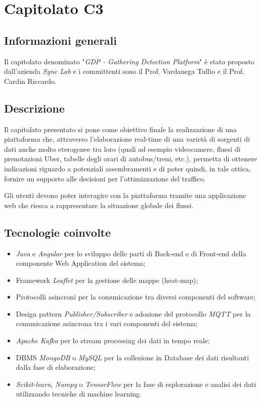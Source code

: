 \section{Capitolato C3}

\subsection{Informazioni generali}{

Il capitolato denominato "\textit{GDP - Gathering Detection Platform}" è stato proposto dall'azienda \textit{Sync Lab} e i committenti sono il Prof. Vardanega Tullio e il Prof. Cardin Riccardo.
}

\subsection{Descrizione}{
Il capitolato presentato si pone come obiettivo finale la realizzazione di una piattaforma che, attraverso l'elaborazione real-time di una varietà di sorgenti di dati anche molto eterogenee tra loro (quali ad esempio videocamere, flussi di prenotazioni Uber, tabelle degli orari di autobus/treni, etc.), permetta di ottenere indicazioni riguardo a potenziali assembramenti e di poter quindi, in tale ottica, fornire un supporto alle decisioni per l'ottimizzazione del traffico.

Gli utenti devono poter interagire con la piattaforma tramite una applicazione web che riesca a rappresentare la situazione globale dei flussi.
}

\subsection{Tecnologie coinvolte}{
\begin{itemize}
\item \textit{Java} e \textit{Angular} per lo sviluppo delle parti di Back-end e di Front-end della componente Web Application del sistema; 
\item Framework \textit{Leaflet} per la gestione delle mappe (heat-map);
\item Protocolli asincroni per la comunicazione tra diversi componenti del software;
\item Design pattern \textit{Publisher/Subscriber} e adozione del protocollo \textit{MQTT} per la comunicazione asincrona tra i vari componenti del sistema;
\item \textit{Apache Kafka} per lo stream processing dei dati in tempo reale;
\item DBMS \textit{MongoDB} o \textit{MySQL}  per la collezione in Database dei dati risultanti dalla fase di elaborazione;
\item \textit{Scikit-learn}, \textit{Numpy} o \textit{TensorFlow} per la fase di esplorazione e analisi dei dati utilizzando tecniche di machine learning.
\end{itemize}
}

